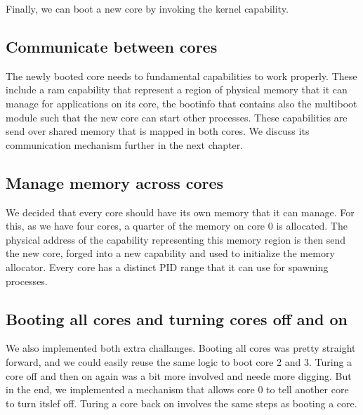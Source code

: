 Finally, we can boot a new core by invoking the kernel capability.

\subsection{Communicate between cores}

The newly booted core needs to fundamental capabilities to work properly. These include a ram capability that represent a region of physical memory that it can manage for applications on its core, the bootinfo that contains also the multiboot module such that the new core can start other processes.
These capabilities are send over shared memory that is mapped in both cores. We discuss its communication mechanism further in the next chapter.

\subsection{Manage memory across cores}

We decided that every core should have its own memory that it can manage. For this, as we have four cores, a quarter of the memory on core 0 is allocated. The physical address of the capability representing this memory region is then send the new core, forged into a new capability and used to initialize the memory allocator.
Every core has a distinct PID range that it can use for spawning processes.

\subsection{Booting all cores and turning cores off and on}

We also implemented both extra challanges. Booting all cores was pretty straight forward, and we could easily reuse the same logic to boot core 2 and 3.
Turing a core off and then on again was a bit more involved and neede more digging. But in the end, we implemented a mechanism that allows core 0 to tell another core to turn itslef off. Turing a core back on involves the same steps as booting a core.



